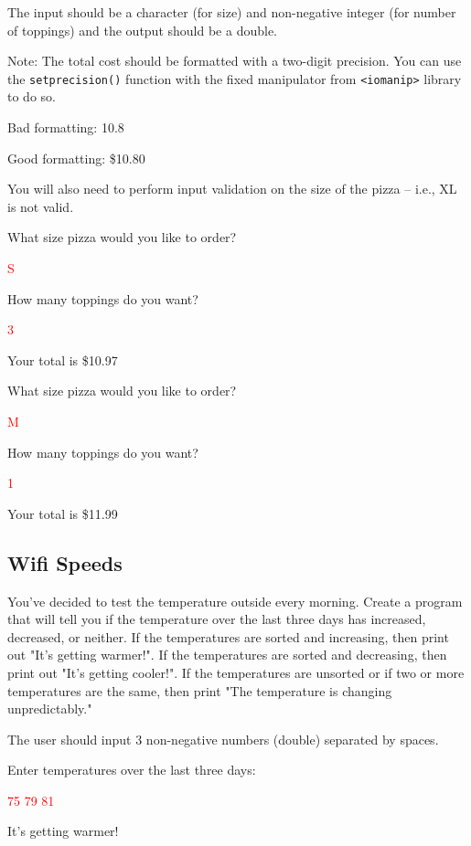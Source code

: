 The input should be a character (for size) and non-negative integer (for number of toppings) and the output should be a double. 

Note: The total cost should be formatted with a two-digit precision. You can use the \texttt{setprecision()} function with the fixed manipulator from \texttt{<iomanip>} library to do so.

Bad formatting: 10.8

Good formatting: \$10.80

You will also need to perform input validation on the size of the pizza -- i.e., XL is not valid. 

\begin{sample}
What size pizza would you like to order?

\textcolor{red}{S}

How many toppings do you want?

\textcolor{red}{3}

Your total is \$10.97
\end{sample}

\begin{sample}
What size pizza would you like to order?

\textcolor{red}{M}

How many toppings do you want?

\textcolor{red}{1}

Your total is \$11.99
\end{sample}

\subsection{Wifi Speeds}

You've decided to test the temperature outside every morning. Create a program that will tell you if the temperature over the last three days has increased, decreased, or neither. If the temperatures are sorted and increasing, then print out "It's getting warmer!". If the temperatures are sorted and decreasing, then print out "It's getting cooler!". If the temperatures are unsorted or if two or more temperatures are the same, then print "The temperature is changing unpredictably."

The user should input 3 non-negative numbers (double) separated by spaces.

\begin{sample}
Enter temperatures over the last three days:

\textcolor{red}{75 79 81}

It's getting warmer!
\end{sample}

